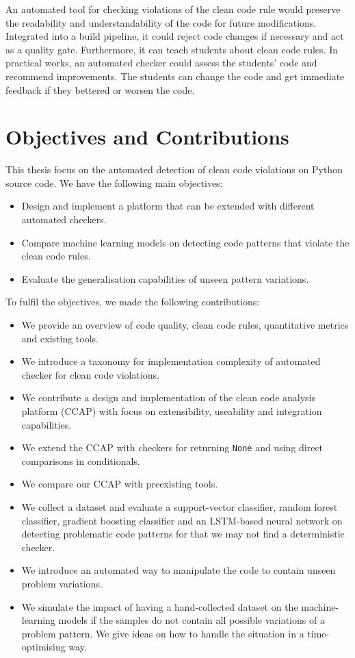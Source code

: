 An automated tool for checking violations of the clean code rule would preserve the readability and understandability of the code for future modifications. Integrated into a build pipeline, it could reject code changes if necessary and act as a quality gate.
Furthermore, it can teach students about clean code rules. In practical works, an automated checker could assess the students' code and recommend improvements. The students can change the code and get immediate feedback if they bettered or worsen the code.


\section{Objectives and Contributions}
This thesis focus on the automated detection of clean code violations on Python source code. 
We have the following main objectives:
\begin{itemize}
    \item Design and implement a platform that can be extended with different automated checkers.
    \item Compare machine learning models on detecting code patterns that violate the clean code rules.
    \item Evaluate the generalisation capabilities of unseen pattern variations.  
\end{itemize}

To fulfil the objectives, we made the following contributions:
\begin{itemize}
    \item We provide an overview of code quality, clean code rules, quantitative metrics and existing tools.
    \item We introduce a taxonomy for implementation complexity of automated checker for clean code violations.
    \item We contribute a design and implementation of the clean code analysis platform (CCAP) with focus on extensibility, useability and integration capabilities.
    \item We extend the CCAP with checkers for returning \texttt{None} and using direct comparisons in conditionals.
    \item We compare our CCAP with preexisting tools.
    \item We collect a dataset and evaluate a support-vector classifier, random forest classifier, gradient boosting classifier and an LSTM-based neural network on detecting problematic code patterns for that we may not find a deterministic checker.
    \item We introduce an automated way to manipulate the code to contain unseen problem variations.
    \item We simulate the impact of having a hand-collected dataset on the machine-learning models if the samples do not contain all possible variations of a problem pattern. We give ideas on how to handle the situation in a time-optimising way.
\end{itemize}

